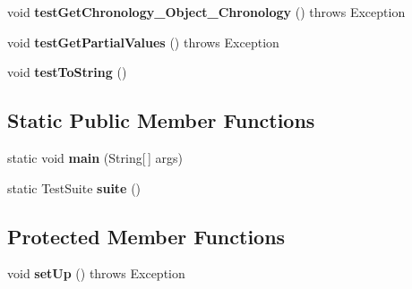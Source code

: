 \begin{DoxyCompactItemize}
\item 
\hypertarget{classorg_1_1joda_1_1time_1_1convert_1_1_test_readable_instant_converter_a885b1f589f6bc20069806b7d237535c5}{void {\bfseries test\-Get\-Chronology\-\_\-\-Object\-\_\-\-Chronology} ()  throws Exception }\label{classorg_1_1joda_1_1time_1_1convert_1_1_test_readable_instant_converter_a885b1f589f6bc20069806b7d237535c5}

\item 
\hypertarget{classorg_1_1joda_1_1time_1_1convert_1_1_test_readable_instant_converter_a1e243f66e0dfd62400e40ed2ffa9a279}{void {\bfseries test\-Get\-Partial\-Values} ()  throws Exception }\label{classorg_1_1joda_1_1time_1_1convert_1_1_test_readable_instant_converter_a1e243f66e0dfd62400e40ed2ffa9a279}

\item 
\hypertarget{classorg_1_1joda_1_1time_1_1convert_1_1_test_readable_instant_converter_a9f4e43d66d3b51c049275b4de2db51bf}{void {\bfseries test\-To\-String} ()}\label{classorg_1_1joda_1_1time_1_1convert_1_1_test_readable_instant_converter_a9f4e43d66d3b51c049275b4de2db51bf}

\end{DoxyCompactItemize}
\subsection*{Static Public Member Functions}
\begin{DoxyCompactItemize}
\item 
\hypertarget{classorg_1_1joda_1_1time_1_1convert_1_1_test_readable_instant_converter_a2c929de7cfb36e14eccfb8ac00c6dbe3}{static void {\bfseries main} (String\mbox{[}$\,$\mbox{]} args)}\label{classorg_1_1joda_1_1time_1_1convert_1_1_test_readable_instant_converter_a2c929de7cfb36e14eccfb8ac00c6dbe3}

\item 
\hypertarget{classorg_1_1joda_1_1time_1_1convert_1_1_test_readable_instant_converter_afa1d33ea28906d03f66a7cd8f5677732}{static Test\-Suite {\bfseries suite} ()}\label{classorg_1_1joda_1_1time_1_1convert_1_1_test_readable_instant_converter_afa1d33ea28906d03f66a7cd8f5677732}

\end{DoxyCompactItemize}
\subsection*{Protected Member Functions}
\begin{DoxyCompactItemize}
\item 
\hypertarget{classorg_1_1joda_1_1time_1_1convert_1_1_test_readable_instant_converter_a2087d93d780d875265ed0f6f16df56a1}{void {\bfseries set\-Up} ()  throws Exception }\label{classorg_1_1joda_1_1time_1_1convert_1_1_test_readable_instant_converter_a2087d93d780d875265ed0f6f16df56a1}

\end{DoxyCompactItemize}


